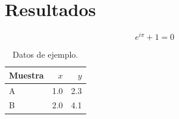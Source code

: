 \section{Resultados}\label{sec:resultados}

\begin{equation}\label{eq:euler}
  e^{i\pi} + 1 = 0
\end{equation}

\begin{table}[htbp]
  \centering
  \caption{Datos de ejemplo.}\label{tab:datos}
  \begin{tabular}{lrr}
    \toprule
    Muestra & $x$ & $y$ \\
    \midrule
    A & 1.0 & 2.3 \\
    B & 2.0 & 4.1 \\
    \bottomrule
  \end{tabular}
\end{table}

